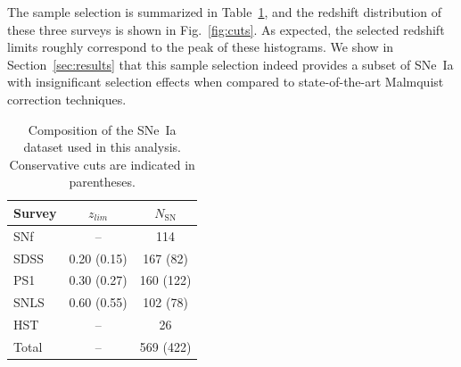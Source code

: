 \documentclass[]{aa} %
\begin{document}
The sample selection is summarized in Table~\ref{tab:sample}, and the redshift
distribution of these three surveys is shown in Fig.~\ref{fig:cuts}. As
expected, the selected redshift limits roughly correspond to the peak of these
histograms. We show in Section~\ref{sec:results} that this sample selection
indeed provides a subset of SNe~Ia with insignificant selection effects when
compared to state-of-the-art Malmquist correction techniques.

\begin{table}
    \centering
    \caption{Composition of the SNe~Ia dataset used in this analysis.
    Conservative cuts are indicated in parentheses.}
    \label{tab:sample}
    \begin{tabular}{l c c}
        \hline\hline
        Survey & $z_{lim}$ & $N_{\mathrm{SN}}$ \\
        \hline
        SNf   & --          & 114 \\
        SDSS  & 0.20 (0.15) & 167 (82)\\
        PS1   & 0.30 (0.27) & 160 (122)\\
        SNLS  & 0.60 (0.55) & 102 (78)\\
        HST   & --          & 26 \\
        \hline
        Total & --          & 569 (422) \\
        \hline
    \end{tabular}
\end{table}
\end{document}
